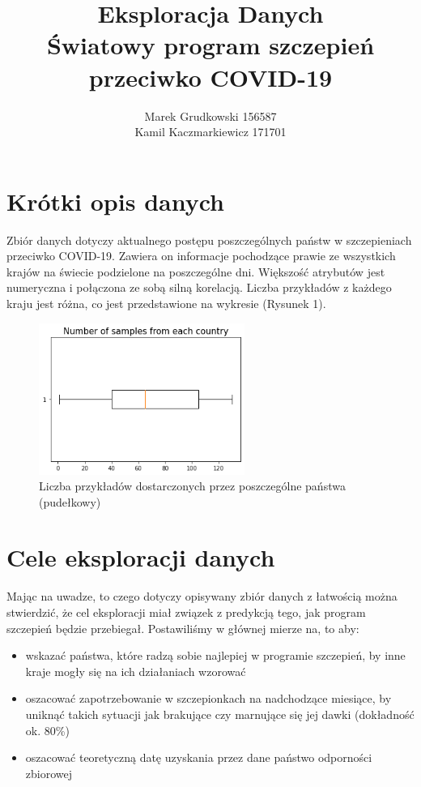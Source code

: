 \documentclass[12pt, oneside]{article}
\title{
	Eksploracja Danych \\
	Światowy program szczepień przeciwko COVID-19
}
\author{
	Marek Grudkowski 156587
	\\
	Kamil Kaczmarkiewicz 171701
}
\begin{document}
\maketitle

\section{Krótki opis danych}

Zbiór danych dotyczy aktualnego postępu poszczególnych państw w szczepieniach przeciwko COVID-19. Zawiera on informacje pochodzące prawie ze wszystkich krajów na świecie podzielone na poszczególne dni. Większość atrybutów jest numeryczna i połączona ze sobą silną korelacją. Liczba przykładów z każdego kraju jest różna, co jest przedstawione na wykresie (Rysunek 1). 

\begin{figure}[h]
\centering
\includegraphics[width=0.6\textwidth]{../img/boxplot_of_samples.png} 
\caption{Liczba przykładów dostarczonych przez poszczególne państwa (pudełkowy)}
\label{Rys:samples}
\end{figure}


\section{Cele eksploracji danych}

Mając na uwadze, to czego dotyczy opisywany zbiór danych z łatwością można stwierdzić, że cel eksploracji miał związek z predykcją tego, jak program szczepień będzie przebiegał. Postawiliśmy w głównej mierze na, to aby:
\begin{itemize}
	\item wskazać państwa, które radzą sobie najlepiej w programie szczepień, by inne kraje mogły się na ich działaniach wzorować
	\item oszacować zapotrzebowanie w szczepionkach na nadchodzące miesiące, by uniknąć takich sytuacji jak brakujące czy marnujące się jej dawki (dokładność ok. 80\%)
	\item oszacować teoretyczną datę uzyskania przez dane państwo odporności zbiorowej
\end{itemize}
\end{document}
